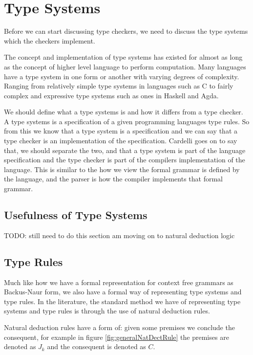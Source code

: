 \section{Type Systems}
Before we can start discussing type checkers, we need to discuss the type systems which the checkers implement.

The concept and implementation of type systems has existed for almost as long as the concept of higher level language to perform computation\cite{Backus:1978:HFI:960118.808380}.
Many languages have a type system in one form or another with varying degrees of complexity.
Ranging from relatively simple type systems in languages such as C to fairly complex and expressive type systems such as ones in Haskell and Agda.

We should define what a type systems is and how it differs from a type checker.
A type systems is a specification of a given programming languages type rules\cite{cardelli1996type}.
So from this we know that a type system is a specification and we can say that a type checker is an implementation of the specification.
Cardelli goes on to say that, we should separate the two, and that a type system is part of the language specification and the type checker is part of the compilers implementation of the language\cite{cardelli1996type}.
This is similar to the how we view the formal grammar is defined by the language, and the parser is how the compiler implements that formal grammar\cite{cardelli1996type}.

\subsection{Usefulness of Type Systems}
TODO: still need to do this section am moving on to natural deduction logic

\subsection{Type Rules}

Much like how we have a formal representation for context free grammars as Backus-Naur form\cite{Backus1960,aho2003compilers,ranta2012implementing}, we also have a formal way of representing type systems and type rules.
In the literature, the standard method we have of representing type systems and type rules is through the use of natural deduction rules\cite{cardelli1996type,ranta2012implementing}.

Natural deduction rules have a form of: given some premises we conclude the consequent\cite{prawitz2006natural,ranta2012implementing}, for example in figure \ref{fig:generalNatDectRule} the premises are denoted as $J_k$ and the consequent is denoted as $C$.

